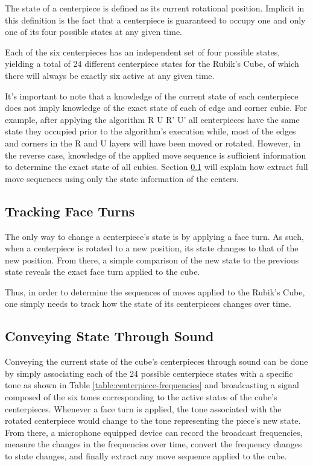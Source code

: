 The state of a centerpiece is defined as its current rotational position. 
Implicit in this definition is the fact that a centerpiece is guaranteed to occupy one and only one of its four possible states at any given time.

Each of the six centerpieces has an independent set of four possible states, yielding a total of 24 different centerpiece states for the Rubik's Cube, of which there will always be exactly six active at any given time.

It's important to note that a knowledge of the current state of each centerpiece does not imply knowledge of the exact state of each of edge and corner cubie.
For example, after applying the algorithm R U R' U' all centerpieces have the same state they occupied prior to the algorithm's execution while, most of the edges and corners in the R and U layers will have been moved or rotated.
However, in the reverse case, knowledge of the applied move sequence is sufficient information to determine the exact state of all cubies.
Section \ref{subsec:tracking-face-turns} will explain how extract full move sequences using only the state information of the centers.

\subsection{Tracking Face Turns}
\label{subsec:tracking-face-turns}
The only way to change a centerpiece's state is by applying a face turn.
As such, when a centerpiece is rotated to a new position, its state changes to that of the new position.
From there, a simple comparison of the new state to the previous state reveals the exact face turn applied to the cube.

Thus, in order to determine the sequences of moves applied to the Rubik's Cube, one simply needs to track how the state of its centerpieces changes over time. 

\subsection{Conveying State Through Sound}
\label{subsec:conveying-state-through-sound}
Conveying the current state of the cube's centerpieces through sound can be done by simply associating each of the 24 possible centerpiece states with a specific tone as shown in Table \ref{table:centerpiece-frequencies} and broadcasting a signal composed of the six tones corresponding to the active states of the cube's centerpieces.
Whenever a face turn is applied, the tone associated with the rotated centerpiece would change to the tone representing the piece's new state.
From there, a microphone equipped device can record the broadcast frequencies, measure the changes in the frequencies over time, convert the frequency changes to state changes, and finally extract any move sequence applied to the cube.

